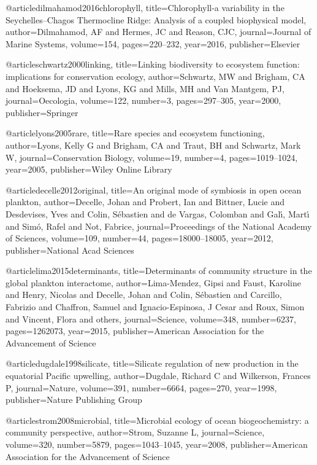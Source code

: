 {@article{dilmahamod2016chlorophyll,
  title={Chlorophyll-a variability in the Seychelles--Chagos Thermocline Ridge: Analysis of a coupled biophysical model},
  author={Dilmahamod, AF and Hermes, JC and Reason, CJC},
  journal={Journal of Marine Systems},
  volume={154},
  pages={220--232},
  year={2016},
  publisher={Elsevier}
}


@article{schwartz2000linking,
  title={Linking biodiversity to ecosystem function: implications for conservation ecology},
  author={Schwartz, MW and Brigham, CA and Hoeksema, JD and Lyons, KG and Mills, MH and Van Mantgem, PJ},
  journal={Oecologia},
  volume={122},
  number={3},
  pages={297--305},
  year={2000},
  publisher={Springer}
}

@article{lyons2005rare,
  title={Rare species and ecosystem functioning},
  author={Lyons, Kelly G and Brigham, CA and Traut, BH and Schwartz, Mark W},
  journal={Conservation Biology},
  volume={19},
  number={4},
  pages={1019--1024},
  year={2005},
  publisher={Wiley Online Library}
}


@article{decelle2012original,
  title={An original mode of symbiosis in open ocean plankton},
  author={Decelle, Johan and Probert, Ian and Bittner, Lucie and Desdevises, Yves and Colin, S{\'e}bastien and de Vargas, Colomban and Gal{\'\i}, Mart{\'\i} and Sim{\'o}, Rafel and Not, Fabrice},
  journal={Proceedings of the National Academy of Sciences},
  volume={109},
  number={44},
  pages={18000--18005},
  year={2012},
  publisher={National Acad Sciences}
}


@article{lima2015determinants,
  title={Determinants of community structure in the global plankton interactome},
  author={Lima-Mendez, Gipsi and Faust, Karoline and Henry, Nicolas and Decelle, Johan and Colin, S{\'e}bastien and Carcillo, Fabrizio and Chaffron, Samuel and Ignacio-Espinosa, J Cesar and Roux, Simon and Vincent, Flora and others},
  journal={Science},
  volume={348},
  number={6237},
  pages={1262073},
  year={2015},
  publisher={American Association for the Advancement of Science}
}

@article{dugdale1998silicate,
  title={Silicate regulation of new production in the equatorial Pacific upwelling},
  author={Dugdale, Richard C and Wilkerson, Frances P},
  journal={Nature},
  volume={391},
  number={6664},
  pages={270},
  year={1998},
  publisher={Nature Publishing Group}
}

@article{strom2008microbial,
  title={Microbial ecology of ocean biogeochemistry: a community perspective},
  author={Strom, Suzanne L},
  journal={Science},
  volume={320},
  number={5879},
  pages={1043--1045},
  year={2008},
  publisher={American Association for the Advancement of Science}
}

}
